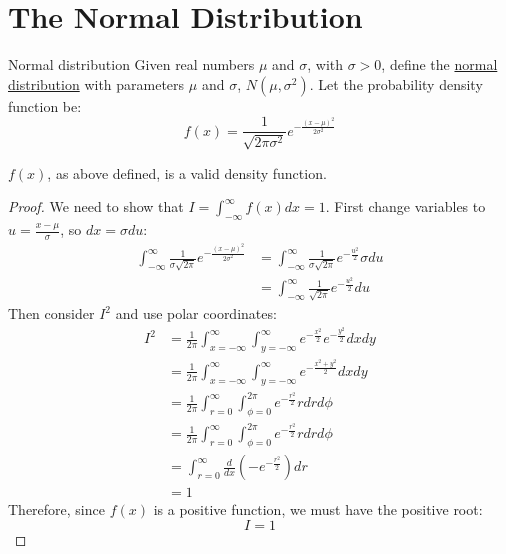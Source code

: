 \documentclass[../Main.tex]{subfiles}
\begin{document}
\section{The Normal Distribution}
\begin{definition}{Normal distribution}
    Given real numbers $\mu$ and $\sigma$, with $\sigma > 0$, define the \underline{normal distribution} with parameters $\mu$ and $\sigma$, $N(\mu, \sigma^2)$. Let the probability density function be:
    \begin{equation*}
        f(x) = \frac{1}{\sqrt{2\pi \sigma^2}} e^{-\frac{(x - \mu)^2}{2\sigma^2}}
    \end{equation*}
\end{definition}
\begin{proposition}
    $f(x)$, as above defined, is a valid density function.
\end{proposition}
\begin{proof}
    We need to show that $I = \int_{-\infty}^\infty f(x) dx = 1$.
    First change variables to $u = \frac{x - \mu}{\sigma}$, so $dx = \sigma du$:
    \begin{align*}
        \int_{-\infty}^\infty \frac{1}{\sigma\sqrt{2\pi}} e^{-\frac{(x - \mu)^2}{2\sigma^2}} &= \int_{-\infty}^\infty \frac{1}{\sigma\sqrt{2\pi}}e^{-\frac{u^2}{2}} \sigma du \\
        &= \int_{-\infty}^\infty \frac{1}{\sqrt{2\pi}}e^{-\frac{u^2}{2}} du
    \end{align*}
    Then consider $I^2$ and use polar coordinates:
    \begin{align*}
        I^2 &= \frac{1}{2\pi} \int_{x = -\infty}^\infty \int_{y = -\infty}^\infty e^{-\frac{x^2}{2}} e^{-\frac{y^2}{2}} dx dy \\
        &= \frac{1}{2\pi} \int_{x = -\infty}^\infty \int_{y = -\infty}^\infty e^{-\frac{x^2 + y^2}{2}} dx dy \\
        &= \frac{1}{2\pi} \int_{r = 0}^\infty \int_{\phi = 0}^{2\pi} e^{-\frac{r^2}{2}} r dr d\phi \\
        &= \frac{1}{2\pi} \int_{r = 0}^\infty \int_{\phi = 0}^{2\pi} e^{-\frac{r^2}{2}} r dr d\phi \\
        &= \int_{r = 0}^\infty \frac{d}{dx}\left(-e^{-\frac{r^2}{2}}\right) dr \\
        &= 1
    \end{align*}
    Therefore, since $f(x)$ is a positive function, we must have the positive root:
    \begin{equation*}
        I = 1
    \end{equation*}
\end{proof}
\end{document}
